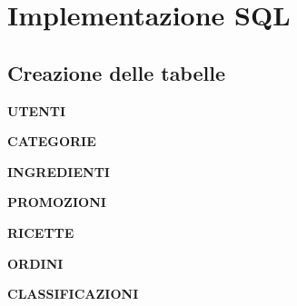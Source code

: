 \chapter{Implementazione SQL}

\section{Creazione delle tabelle}

\vspace{2em}
\textbf{UTENTI}



\vspace{2em}
\textbf{CATEGORIE}



\vspace{2em}
\textbf{INGREDIENTI}



\vspace{2em}
\textbf{PROMOZIONI}



\vspace{2em}
\textbf{RICETTE}



\vspace{2em}
\textbf{ORDINI}



\vspace{2em}
\textbf{CLASSIFICAZIONI}




